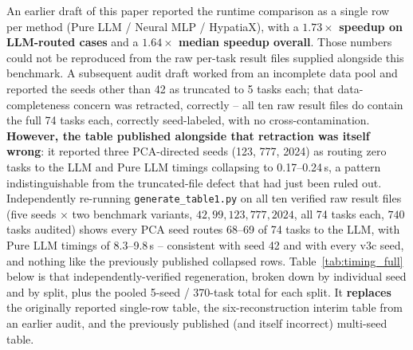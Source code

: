 \documentclass[twoside,11pt]{article}
\begin{document}
An earlier draft of this paper reported the runtime comparison as a single
row per method (Pure LLM / Neural MLP / HypatiaX), with a
\textbf{$1.73\times$ speedup on LLM-routed cases} and a
\textbf{$1.64\times$ median speedup overall}. Those numbers could not be
reproduced from the raw per-task result files supplied alongside this
benchmark. A subsequent audit draft worked from an incomplete data pool
and reported the seeds other than 42 as truncated to 5 tasks each; that
data-completeness concern was retracted, correctly -- all ten raw result
files do contain the full 74 tasks each, correctly seed-labeled, with no
cross-contamination. \textbf{However, the table published alongside that
retraction was itself wrong}: it reported three PCA-directed seeds (123,
777, 2024) as routing zero tasks to the LLM and Pure LLM timings
collapsing to 0.17--0.24\,s, a pattern indistinguishable from the
truncated-file defect that had just been ruled out. Independently
re-running \texttt{generate\_table1.py} on all ten verified raw result
files (five seeds $\times$ two benchmark variants, $42, 99, 123, 777,
2024$, all 74 tasks each, $740$ tasks audited) shows every PCA seed
routes 68--69 of 74 tasks to the LLM, with Pure LLM timings of
8.3--9.8\,s -- consistent with seed 42 and with every v3c seed, and
nothing like the previously published collapsed rows. Table~\ref{tab:timing_full}
below is that independently-verified regeneration, broken down by
individual seed and by split, plus the pooled 5-seed / 370-task total for
each split. It \textbf{replaces} the originally reported single-row
table, the six-reconstruction interim table from an earlier audit, and
the previously published (and itself incorrect) multi-seed table.
\end{document}
